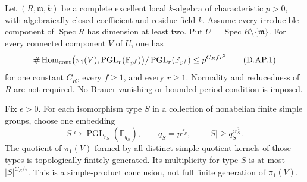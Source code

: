 \begin{corollary}
\label{D:complete-local-projective-growth-all-dimensions}
Let \((R,\mathfrak m,k)\) be a complete excellent local
\(k\)-algebra of characteristic \(p>0\), with algebraically
closed coefficient and residue field \(k\).
Assume every irreducible component of \(\operatorname{Spec}R\)
has dimension at least two. Put
\(U=\operatorname{Spec}R\setminus\{\mathfrak m\}\).
For every connected component \(V\) of \(U\), one has
\[
 \#\operatorname{Hom}_{\rm cont}
       \bigl(\pi_1(V),\operatorname{PGL}_r(\mathbb F_{p^f})\bigr)
          /\operatorname{PGL}_r(\mathbb F_{p^f})
                    \leq p^{C_R f r^2}                \tag{D.AP.1}
\]
for one constant \(C_R\), every \(f\geq1\), and every
\(r\geq1\). Normality and reducedness of \(R\) are not
required. No Brauer-vanishing or bounded-period condition
is imposed.

Fix \(\epsilon>0\). For each isomorphism type \(S\) in
a collection of nonabelian finite simple groups, choose
one embedding
\[
 S\hookrightarrow\operatorname{PGL}_{r_S}(\mathbb F_{q_S}),
 \qquad q_S=p^{f_S},\qquad |S|\geq q_S^{\epsilon r_S^2}.
\]
The quotient of \(\pi_1(V)\) formed by all distinct
simple quotient kernels of those types is topologically
finitely generated. Its multiplicity for type \(S\) is
at most \(|S|^{C_R/\epsilon}\). This is a simple-product
conclusion, not full finite generation of \(\pi_1(V)\).
\end{corollary}

